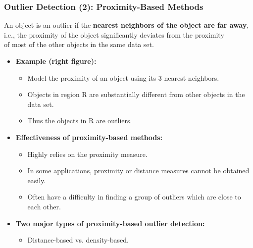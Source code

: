 \begin{frame}
	\frametitle{Outlier Detection (2): Proximity-Based Methods}

	An object is an outlier if the \textbf{\color{airforceblue}nearest neighbors of the object are far away},\\ i.e., the proximity of the object significantly deviates from the proximity\\ of most of the other objects in the same data set.
	\begin{itemize}

		\item \textbf{Example (right figure):}
		      \begin{itemize}
			      \item Model the proximity of an object using its 3 nearest neighbors.
			      \item Objects in region R are substantially different from other objects in the data set.
			      \item Thus the objects in R are outliers.
		      \end{itemize}
		\item \textbf{Effectiveness of proximity-based methods:}
		      \begin{itemize}
			      \item Highly relies on the proximity measure.
			      \item In some applications, proximity or distance measures cannot be obtained easily.
			      \item Often have a difficulty in finding a group of outliers which are close to each other.
		      \end{itemize}
		\item \textbf{Two major types of proximity-based outlier detection:}
		      \begin{itemize}
			      \item Distance-based vs. density-based.
		      \end{itemize}
	\end{itemize}


\end{frame}
